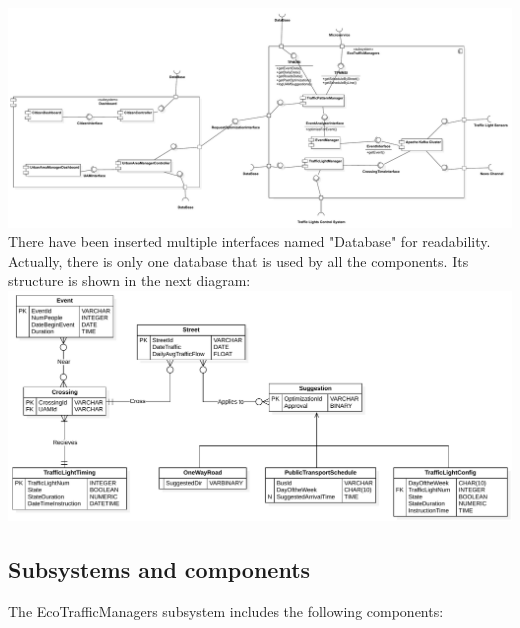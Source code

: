 \documentclass[12pt, a4paper, twoside, openright]{report}
\begin{document}
\includegraphics[width=\linewidth]{images/svg/ComponentDiagram.pdf}
There have been inserted multiple interfaces named "Database" for readability. Actually, there is only one database that is used by all the components.
Its structure is shown in the next diagram:\\
\includegraphics[width=\linewidth]{images/svg/DiagrammaER_V2.pdf}

\subsection{Subsystems and components}

The EcoTrafficManagers subsystem includes the following components:
\end{document}
